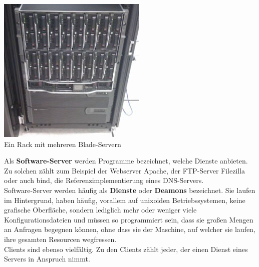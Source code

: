 \documentclass[12pt,a4paper]{report}
\begin{document}
\begin{center}
\includegraphics[scale=0.8]{../docs/tarkes/pics/ServerRack.jpg}\\
Ein Rack mit mehreren Blade-Servern 
\end{center}

Als \textbf{Software-Server} werden Programme bezeichnet, welche Dienste anbieten. Zu solchen zählt zum Beispiel der Webserver Apache, der FTP-Server Filezilla oder auch bind, die Referenzimplementierung eines DNS-Servers.\\
Software-Server werden häufig als \textbf{Dienste} oder \textbf{Deamons} bezeichnet. Sie laufen im Hintergrund, haben häufig, vorallem auf unixoiden Betriebssystemen, keine grafische Oberfläche, sondern lediglich mehr oder weniger viele Konfigurationsdateien und müssen so programmiert sein, dass sie großen Mengen an Anfragen begegnen können, ohne dass sie der Maschine, auf welcher sie laufen, ihre gesamten Resourcen wegfressen.\\

Clients sind ebenso vielfältig. Zu den Clients zählt jeder, der einen Dienst eines Servers in Anspruch nimmt. 
\end{document}
